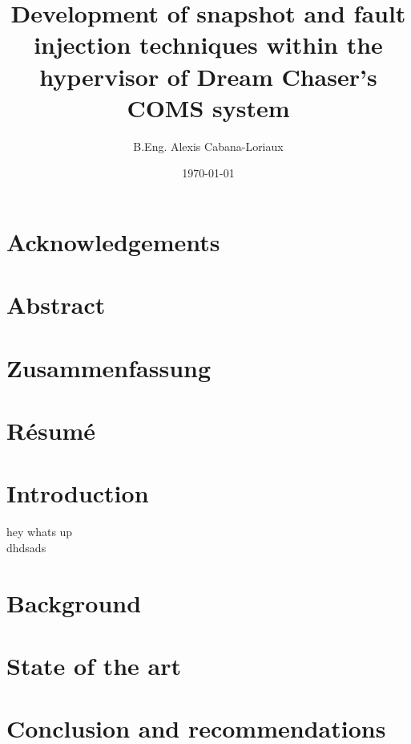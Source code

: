 \documentclass[12pt,english]{rftthesis}
\title           {Development of snapshot and fault injection techniques within the hypervisor of Dream Chaser's COMS system}
\author          {B.Eng. Alexis Cabana-Loriaux}
\date            {\today}
\begin{document}
\maketitle
\makedeclaration

{ 
\onehalfspacing
\chapter*{Acknowledgements}\label{cha:ack}

\chapter*{Abstract}\label{cha:abstract}

\chapter*{Zusammenfassung}\label{cha:zusammenfassung}

\chapter*{Résumé}\label{cha:resume}
}

\tableofcontents

\listoftables

\listoffigures

\printnoidxglossaries

{
\onehalfspacing
\chapter{Introduction}\label{cha:intro}
hey whats up\\ dhdsads
\chapter{Background}\label{cha:background}

\chapter{State of the art}\label{cha:stateoftheart}

\chapter{Conclusion and recommendations}\label{cha:conclusion}
}
\end{document}

